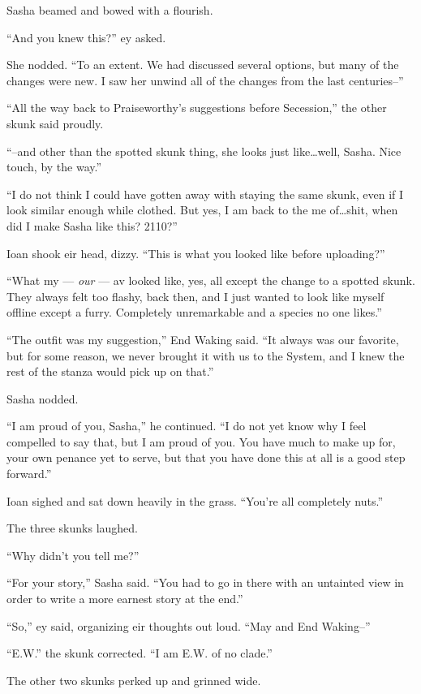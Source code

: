 Sasha beamed and bowed with a flourish.

``And you knew this?'' ey asked.

She nodded. ``To an extent. We had discussed several options, but many of the changes were new. I saw her unwind all of the changes from the last centuries--''

``All the way back to Praiseworthy's suggestions before Secession,'' the other skunk said proudly.

``--and other than the spotted skunk thing, she looks just like\ldots well, Sasha. Nice touch, by the way.''

``I do not think I could have gotten away with staying the same skunk, even if I look similar enough while clothed. But yes, I am back to the me of\ldots shit, when did I make Sasha like this? 2110?''

Ioan shook eir head, dizzy. ``This is what you looked like before uploading?''

``What my — \emph{our} — av looked like, yes, all except the change to a spotted skunk. They always felt too flashy, back then, and I just wanted to look like myself offline except a furry. Completely unremarkable and a species no one likes.''

``The outfit was my suggestion,'' End Waking said. ``It always was our favorite, but for some reason, we never brought it with us to the System, and I knew the rest of the stanza would pick up on that.''

Sasha nodded.

``I am proud of you, Sasha,'' he continued. ``I do not yet know why I feel compelled to say that, but I am proud of you. You have much to make up for, your own penance yet to serve, but that you have done this at all is a good step forward.''

Ioan sighed and sat down heavily in the grass. ``You're all completely nuts.''

The three skunks laughed.

``Why didn't you tell me?''

``For your story,'' Sasha said. ``You had to go in there with an untainted view in order to write a more earnest story at the end.''

``So,'' ey said, organizing eir thoughts out loud. ``May and End Waking--''

``E.W.'' the skunk corrected. ``I am E.W. of no clade.''

The other two skunks perked up and grinned wide.

